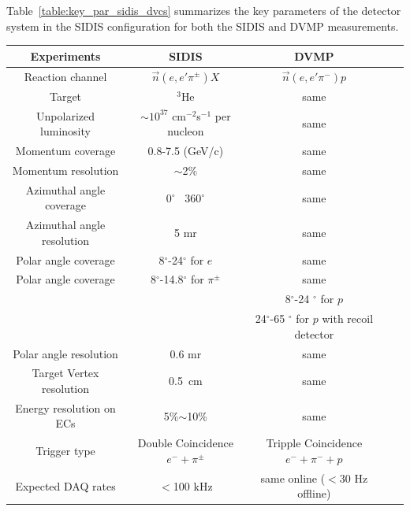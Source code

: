Table~\ref{table:key_par_sidis_dvcs} summarizes the key parameters of the detector system in the SIDIS configuration for both the SIDIS and DVMP measurements. 
\begin{table}\centering
\begin{tabular}{|c|c|c|c|c|}
\hline
Experiments                             & SIDIS                 & DVMP  \\\hline
Reaction channel                     &  $\vec{n}(e,e'\pi^{\pm})X$    & $\vec{n}(e,e'\pi^{-})p$	\\\hline
Target                                       & $^3$He                &same 	\\\hline
Unpolarized luminosity             & $\sim10^{37}$ cm$^{-2}$s$^{-1}$ per nucleon        & same	\\\hline 
Momentum coverage   & 0.8-7.5 (GeV/c)               &same 	\\\hline
Momentum resolution              &  $\sim$2\%            & same\\\hline
Azimuthal angle coverage      & 0$^{\circ}$ ~360$^{\circ}$                  & same	\\\hline
Azimuthal angle resolution      & 5 mr                  & same	\\\hline
Polar angle coverage              &  8$^{\circ}$-24$^{\circ}$ for $e$                 &  same \\\hline
Polar angle coverage              &  8$^{\circ}$-14.8$^{\circ}$ for $\pi^{\pm}$  &  same 	\\\hline
				                                 &                                                        & 8$^{\circ}$-24 $^{\circ}$ for $p$         \\\hline
   				                                 &                                                        & 24$^{\circ}$-65 $^{\circ}$ for $p$ with recoil detector         \\\hline
 Polar angle resolution             & 0.6 mr                & same	\\\hline
Target Vertex resolution          & 0.5~cm                & same \\\hline
 Energy resolution on ECs      & 5\%$\sim$10\%         & same   \\\hline
Trigger type                             & Double Coincidence $e^-+\pi^{\pm}$ & Tripple Coincidence $e^-+\pi^{-}+p$\\\hline
Expected DAQ rates               &  $<$100 kHz           &  same online ($<$30 Hz offline)\\\hline

\end{tabular}
\end{table}
